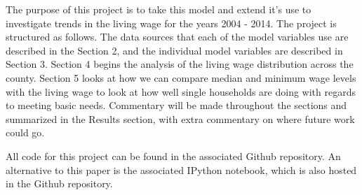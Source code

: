 The purpose of this project is to take this model and extend it's use to investigate trends in the living wage for the years 2004 - 2014. The project is structured as follows. The data sources that each of the model variables use are described in the Section 2, and the individual model variables are described in Section 3. Section 4 begins the analysis of the living wage distribution across the county. Section 5 looks at how we can compare median and minimum wage levels with the living wage to look at how well single households are doing with regards to meeting basic needs. Commentary will be made throughout the sections and summarized in the Results section, with extra commentary on where future work could go.

All code for this project can be found in the associated Github repository\cite{github}. An alternative to this paper is the associated IPython notebook\cite{notebook}, which is also hosted in the Github repository.



%



